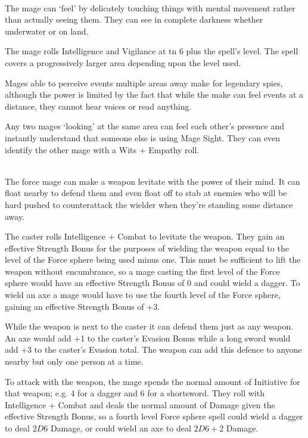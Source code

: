 \begin{multicols}{2}
\\
The mage can `feel' by delicately touching things with mental movement rather than actually seeing them. They can see in complete darkness whether underwater or on land.

The mage rolls Intelligence and Vigilance at \gls{tn} 6 plus the spell's level.
The spell covers a progressively larger area depending upon the level used.

\noindent Mages able to perceive events multiple areas away make for legendary spies, although the power is limited by the fact that while the make can feel events at a distance, they cannot hear voices or read anything.

Any two mages `looking' at the same area can feel each other's presence and instantly understand that someone else is using Mage Sight.
They can even identify the other mage with a Wits + Empathy roll.

\\
The force mage can make a weapon levitate with the power of their mind. It can float nearby to defend them and even float off to stab at enemies who will be hard pushed to counterattack the wielder when they're standing some distance away.

The caster rolls Intelligence + Combat to levitate the weapon.
They gain an effective Strength Bonus for the purposes of wielding the weapon equal to the level of the Force sphere being used minus one.
This must be sufficient to lift the weapon without encumbrance, so a mage casting the first level of the Force sphere would have an effective Strength Bonus of 0 and could wield a dagger.
To wield an axe a mage would have to use the fourth level of the Force sphere, gaining an effective Strength Bonus of +3.

While the weapon is next to the caster it can defend them just as any weapon. An axe would add +1 to the caster's Evasion Bonus while a long sword would add +3 to the caster's Evasion total. The weapon can add this defence to anyone nearby but only one person at a time.

To attack with the weapon, the mage spends the normal amount of Initiative for that weapon; e.g. 4 for a dagger and 6 for a shortsword.
They roll with Intelligence + Combat and deals the normal amount of Damage given the effective Strength Bonus, so a fourth level Force sphere spell could wield a dagger to deal $2D6$ Damage, or could wield an axe to deal $2D6+2$ Damage.


\end{multicols}

